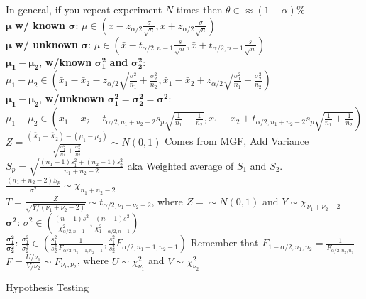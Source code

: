 \documentclass[answers,12pt,addpoints]{exam}
\begin{document}
In general, if you repeat experiment $N$ times then $\theta \in \approx (1-\alpha)\%$\\
$\boldsymbol{\mu}$ \textbf{w/ known} $\boldsymbol{\sigma}$: $\mu \in \left(\bar{x} - z_{\alpha/2}\frac{\sigma}{\sqrt{n}}, \bar{x} + z_{\alpha/2}\frac{\sigma}{\sqrt{n}}\right)$\\ 
$\boldsymbol{\mu}$ \textbf{w/ unknown} $\boldsymbol{\sigma}$: $\mu \in \left(\bar{x} - t_{\alpha/2, n-1}\frac{s}{\sqrt{n}}, \bar{x} + t_{\alpha/2, n-1}\frac{s}{\sqrt{n}}\right)$\\
$\boldsymbol{\mu_1 - \mu_2}$, \textbf{w/known} $\boldsymbol{\sigma_1^2}$ \textbf{and} $\boldsymbol{\sigma_2^2}$: $\mu_1 - \mu_2 \in \left(\bar{x}_1 - \bar{x}_2 - z_{\alpha/2}\sqrt{\frac{\sigma_1^2}{n_1} + \frac{\sigma_2^2}{n_2}}, \bar{x}_1 - \bar{x}_2 + z_{\alpha/2}\sqrt{\frac{\sigma_1^2}{n_1} + \frac{\sigma_2^2}{n_2}}\right)$\\
$\boldsymbol{\mu_1 - \mu_2}$, \textbf{w/unknown} $\boldsymbol{\sigma_1^2 = \sigma_2^2 = \sigma^2}$:\\
$\mu_1 - \mu_2 \in \left(\bar{x}_1 - \bar{x}_2 - t_{\alpha/2, n_1+n_2-2}s_p\sqrt{\frac{1}{n_1} + \frac{1}{n_2}}, \bar{x}_1 - \bar{x}_2 + t_{\alpha/2, n_1+n_2-2}s_p\sqrt{\frac{1}{n_1} + \frac{1}{n_2}}\right)$\\ 
$Z = \frac{(\bar{X}_1 - \bar{X}_2) - (\mu_1 - \mu_2)}{\sqrt{\frac{\sigma_1^2}{n_1} + \frac{\sigma_2^2}{n_2}}} \sim N(0,1)$  Comes from MGF, Add Variance\\
$S_p = \sqrt{\frac{(n_1-1)s_1^2 + (n_2-1)s_2^2}{n_1+n_2-2}}$ aka Weighted average of $S_1$ and $S_2$. $\frac{(n_1 + n_2 - 2) S_p}{\sigma^2} \sim \chi_{n_1+n_2 -2}$\\
$T = \frac{Z}{\sqrt{Y / (\nu_1 + \nu_2 -2 )}} \sim t_{\alpha/2 , \nu_1 + \nu_2 - 2}$, where $Z =\sim N(0,1)$ and $Y \sim \chi_{\nu_1 + \nu_2 - 2}$\\
$\boldsymbol{\sigma^2}$: $\sigma^2 \in \left(\frac{(n-1)s^2}{\chi_{\alpha/2, n-1}^2}, \frac{(n-1)s^2}{\chi_{1-\alpha/2, n-1}^2}\right)$\\
$\boldsymbol{\frac{\sigma_1^2}{\sigma_2^2}}$: $\frac{\sigma_1^2}{\sigma_2^2} \in \left(\frac{s_1^2}{s_2^2}\frac{1}{F_{\alpha/2, n_1-1, n_2-1}}, \frac{s_1^2}{s_2^2}F_{\alpha/2, n_1-1, n_2-1}\right)$ Remember that $F_{1-\alpha/2, n_1, n_2} = \frac{1}{F_{\alpha/2, n_2, n_1}}$\\
$F = \frac{U / \nu_1}{V / \nu_2} \sim F_{\nu_1, \nu_2}$, where $U \sim \chi_{\nu_1}^2$ and $V \sim \chi_{\nu_2}^2$  
\begin{center}
    Hypothesis Testing
\end{center}
\end{document}
